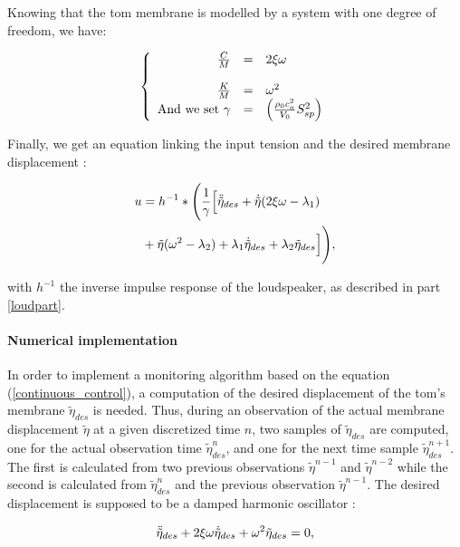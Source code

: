 \documentclass[11pt, twocolumn]{article}
\begin{document}
Knowing that the tom membrane is modelled by a system with one degree of freedom, we have:

\[
\left\{
\begin{array}{r c l}
\frac{C}{M} &=& 2 \xi \omega\\
\\
\frac{K}{M} &=& \omega^2
\\
\text{And we set }\gamma &=& \Big(\frac{\rho_0c_a^2}{V_0} S_{sp}^2 \Big)
\end{array}
\right.
\]

 Finally, we get an equation linking the input tension and the desired membrane displacement : 

\begin{align}
    u &= h^{-1} * \Bigg( \frac{1}{\gamma} \Big[ \Ddot{\tilde{\eta}}_{des} + \dot{\tilde{\eta}} (2 \xi\omega - \lambda_1) \nonumber \\
    & + \tilde{\eta} (\omega^2 - \lambda_2) + \lambda_1 \dot{\tilde{\eta}}_{des} + \lambda_2 \tilde{\eta}_{des} \Big] \Bigg),
    \label{continuous_control}
\end{align}


with $h^{-1}$ the inverse impulse response of the loudspeaker, as described in part \ref{loudpart}.

\paragraph{Numerical implementation} 

In order to implement a monitoring algorithm based on the equation (\ref{continuous_control}), a computation of the desired displacement of the tom's membrane $\tilde{\eta}_{des}$ is needed. Thus, during an observation of the actual membrane displacement $\tilde{\eta}$ at a given discretized time $n$, two samples of $\tilde{\eta}_{des}$ are computed, one for the actual observation time $\tilde{\eta}_{des}^n$, and one for the next time sample $\tilde{\eta}_{des}^{n+1}$. The first is calculated from two previous observations $\tilde{\eta}^{n-1}$ and $\tilde{\eta}^{n-2}$ while the second is calculated from $\tilde{\eta}_{des}^n$ and the previous observation $\tilde{\eta}^{n-1}$. The desired displacement is supposed to be a damped harmonic oscillator :

\begin{equation}
    \Ddot{\tilde{\eta}}_{des} + 2 \xi \omega \dot{\tilde{\eta}}_{des} + \omega^2 \tilde{\eta}_{des} = 0,
\end{equation}
\end{document}
